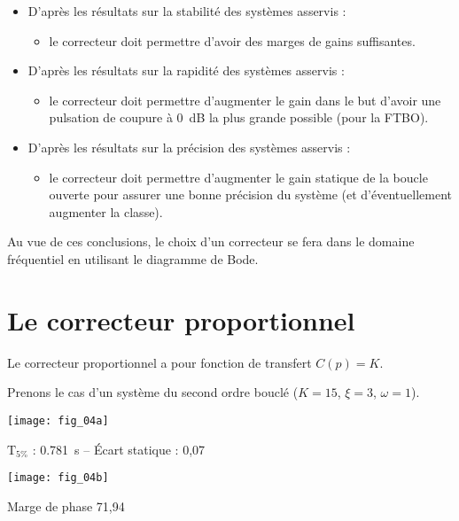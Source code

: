\begin{resultat} 
\begin{itemize}
\item D'après les résultats sur la stabilité des systèmes asservis :
\begin{itemize}
\item le correcteur doit permettre d'avoir des marges de gains suffisantes.
\end{itemize}
\item D'après les résultats sur la rapidité des systèmes asservis :
\begin{itemize}
\item le correcteur doit permettre d'augmenter le gain dans le but d'avoir une pulsation de coupure à \SI{0}{dB} la plus grande possible (pour la FTBO).
\end{itemize}
\item D'après les résultats sur la précision des systèmes asservis :
\begin{itemize}
\item le correcteur doit permettre d'augmenter le gain statique de la boucle ouverte pour assurer une bonne précision du système (et d’éventuellement augmenter la classe).
\end{itemize}
\end{itemize}
Au vue de ces conclusions, le choix d'un correcteur se fera dans le domaine fréquentiel en utilisant le diagramme de Bode. 
\end{resultat}


\section{Le correcteur proportionnel}

\begin{defi}[Correcteur P]
Le correcteur proportionnel a pour fonction de transfert $C(p)=K$.
\end{defi}

Prenons le cas d'un système du second ordre bouclé ($K=15$, $\xi=3$, $\omega=1$).

\noindent
\begin{minipage}[c]{.46\linewidth}
\begin{center}
\texttt{[image: fig\_04a]}

$\text{T}_{5\%}$ : \SI{0,781}{s} -- Écart statique : 0,07
\end{center}

\end{minipage} \hfill
\begin{minipage}[c]{.46\linewidth}
\begin{center}
\texttt{[image: fig\_04b]}

Marge de phase 71,94 \degres
\end{center}
\end{minipage} 


